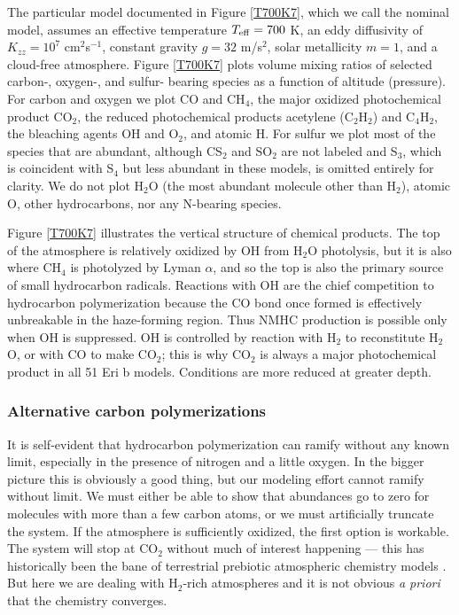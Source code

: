 \documentclass[preprint]{aastex6}
\newcounter{reaction}
\begin{document}
The particular model documented in Figure \ref{T700K7}, which we call the nominal model,
 assumes an effective temperature $T_{\rm eff}=700$ K, an eddy diffusivity of $K_{zz}=10^7$ cm$^2$s$^{-1}$,
 constant gravity $g=32$ m/s$^2$, solar metallicity $m=1$, and a cloud-free atmosphere.
Figure \ref{T700K7} plots
volume mixing ratios of selected carbon-, oxygen-, and sulfur- bearing species as a function of altitude (pressure).
For carbon and oxygen we plot CO and CH$_4$,
 the major oxidized photochemical product CO$_2$, 
 the reduced photochemical products acetylene (C$_2$H$_2$) and C$_4$H$_2$,
 the bleaching agents OH and O$_2$, and atomic H.
 For sulfur we plot most of the species that are abundant, although CS$_2$ and SO$_2$ are not
 labeled and S$_3$, which is coincident with S$_4$ but less abundant in these models, is omitted entirely for clarity. 
We do not plot H$_2$O (the most abundant molecule other than H$_2$),
atomic O, other hydrocarbons, nor any N-bearing species.

Figure \ref{T700K7} illustrates the vertical structure of chemical products. 
The top of the atmosphere is relatively oxidized by OH from H$_2$O photolysis, but it is also
where CH$_4$ is photolyzed by Lyman $\alpha$, and so the top is also the primary source of small
hydrocarbon radicals. 
Reactions with OH are the chief competition to hydrocarbon polymerization because the
 CO bond once formed is effectively unbreakable in the haze-forming region.
 Thus NMHC production is possible only when OH is suppressed. 
OH is controlled by reaction with H$_2$ to reconstitute H$_2$O, or with CO to make CO$_2$;
this is why CO$_2$ is always a major photochemical product in all 51 Eri b models.
Conditions are more reduced at greater depth. 

\subsubsection{Alternative carbon polymerizations}
\label{Results:carbon}

It is self-evident that hydrocarbon polymerization can ramify without any known limit,
especially in the presence of nitrogen and a little oxygen.
In the bigger picture this is obviously a good thing, but our modeling effort cannot ramify without limit. 
We must either be able to show that abundances go to zero for molecules with more than a few carbon atoms,
or we must artificially truncate the system.  
If the atmosphere is sufficiently oxidized, the first option is workable.
The system will stop at CO$_2$ without much of interest happening ---
this has historically been the bane of terrestrial prebiotic atmospheric chemistry models \citep[][]{Abelson1966,Pinto1980}.
But here we are dealing with H$_2$-rich atmospheres and it is not obvious {\it a priori} that the chemistry converges.
\end{document}
